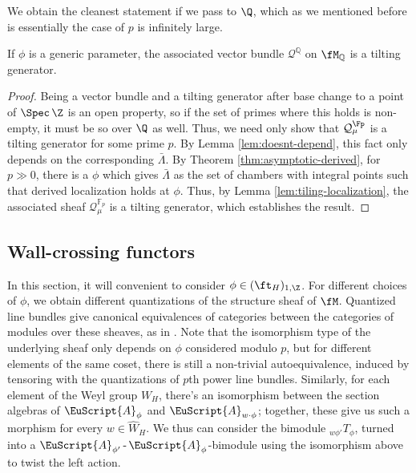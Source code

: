 We obtain the cleanest statement if we pass to $\Q$, which as we mentioned before is essentially the case of $p$ is infinitely large.
\begin{theorem}
  If $\phi$ is a generic parameter, the associated vector bundle $\mathcal{Q}^{\mathbb{Q}}$ on $\fM_{\mathbb{Q}}$ is a tilting generator.
\end{theorem}
\begin{proof}
   Being a vector bundle and a tilting generator after base change to a point of $\Spec\,
   \Z$ is an open property, so if the set of primes where this holds
   is non-empty, it must be so over $\Q$ as well.  Thus, we need only
   show that $\mathcal{Q}_\mu^{\Fp}$ is a tilting generator for some
   prime $p$.  By Lemma \ref{lem:doesnt-depend}, this fact only
   depends on the corresponding $\bar \Lambda$.  By Theorem
   \ref{thm:asymptotic-derived}, for $p\gg 0$, there is a $\phi$ which
   gives $\bar \Lambda$ as the set of chambers with integral points
   such that derived localization holds at $\phi$.  Thus, by Lemma
   \ref{lem:tiling-localization}, the associated sheaf
   $\mathcal{Q}_\mu^{\mathbb{F}_p}$ is a tilting generator, which
   establishes the result.
\end{proof}

\subsection{Wall-crossing functors}

In this section, it will convenient to consider $\phi\in (\ft_H)_{1,\Z}$.   
For different choices of $\phi$, we obtain different quantizations of
the structure sheaf of $\fM$.  Quantized line bundles give canonical
equivalences of categories between the categories of modules over
these sheaves, as in \cite{BLPWquant}.  Note that the isomorphism type
of the underlying sheaf only depends on $\phi$ considered modulo $p$,
but for different elements of the same coset, there is still a
non-trivial autoequivalence, induced by tensoring with the
quantizations of $p$th power line bundles.  Similarly, for each
element of the Weyl group $W_H$, there's an isomorphism between the
section algebras of $\EuScript{A}_{\phi}$ and $ \EuScript{A}_{w\cdot
  \phi}$; together, these give us such a morphism for every $w\in
\widehat{W}_H$.  We thus can consider the bimodule
${}_{w\phi'}T_{\phi}$, turned into a
$\EuScript{A}_{\phi'}\operatorname{-}\EuScript{A}_{\phi}$-bimodule
using the isomorphism above to twist the left action.

